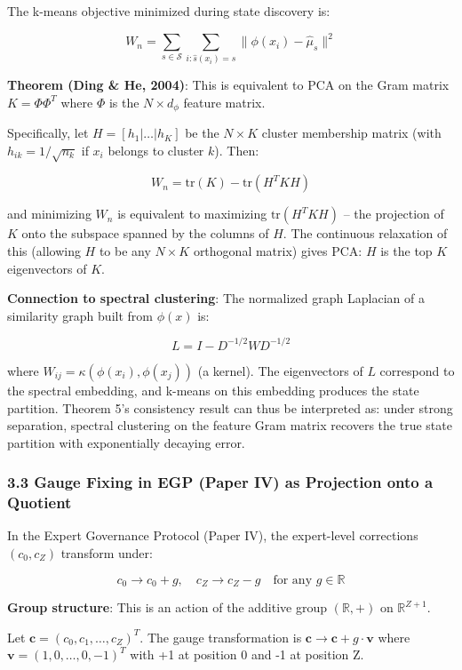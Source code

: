 \documentclass[
  12pt,
]{article}
\begin{document}
The k-means objective minimized during state discovery is:

\[W_n = \sum_{s \in \mathcal{S}} \sum_{i: \hat{s}(x_i) = s} \|\phi(x_i) - \hat{\mu}_s\|^2\]

\textbf{Theorem (Ding \& He, 2004)}: This is equivalent to PCA on the
Gram matrix \(K = \Phi\Phi^T\) where \(\Phi\) is the \(N \times d_\phi\)
feature matrix.

Specifically, let \(H = [h_1 | \dots | h_K]\) be the \(N \times K\)
cluster membership matrix (with \(h_{ik} = 1/\sqrt{n_k}\) if \(x_i\)
belongs to cluster \(k\)). Then:

\[W_n = \text{tr}(K) - \text{tr}(H^T K H)\]

and minimizing \(W_n\) is equivalent to maximizing
\(\text{tr}(H^T K H)\) -- the projection of \(K\) onto the subspace
spanned by the columns of \(H\). The continuous relaxation of this
(allowing \(H\) to be any \(N \times K\) orthogonal matrix) gives PCA:
\(H\) is the top \(K\) eigenvectors of \(K\).

\textbf{Connection to spectral clustering}: The normalized graph
Laplacian of a similarity graph built from \(\phi(x)\) is:

\[L = I - D^{-1/2} W D^{-1/2}\]

where \(W_{ij} = \kappa(\phi(x_i), \phi(x_j))\) (a kernel). The
eigenvectors of \(L\) correspond to the spectral embedding, and k-means
on this embedding produces the state partition. Theorem 5's consistency
result can thus be interpreted as: under strong separation, spectral
clustering on the feature Gram matrix recovers the true state partition
with exponentially decaying error.

\subsubsection{3.3 Gauge Fixing in EGP (Paper IV) as Projection onto a
Quotient}\label{gauge-fixing-in-egp-paper-iv-as-projection-onto-a-quotient}

In the Expert Governance Protocol (Paper IV), the expert-level
corrections \((c_0, c_Z)\) transform under:

\[c_0 \to c_0 + g, \quad c_Z \to c_Z - g \quad \text{for any } g \in \mathbb{R}\]

\textbf{Group structure}: This is an action of the additive group
\((\mathbb{R}, +)\) on \(\mathbb{R}^{Z+1}\).

Let \(\mathbf{c} = (c_0, c_1, \dots, c_Z)^T\). The gauge transformation
is \(\mathbf{c} \to \mathbf{c} + g \cdot \mathbf{v}\) where
\(\mathbf{v} = (1, 0, \dots, 0, -1)^T\) with +1 at position 0 and -1 at
position Z.
\end{document}

